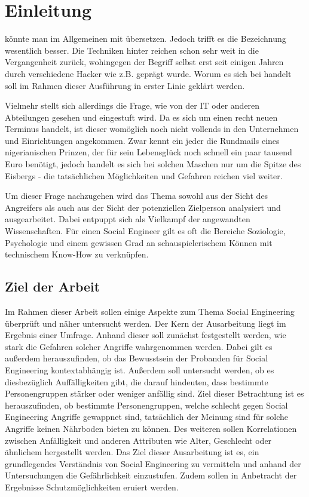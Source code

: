 \section{Einleitung}\label{sec:2_einleitung}
 könnte man im Allgemeinen mit  übersetzen.
Jedoch trifft es die Bezeichnung  wesentlich besser.
Die Techniken hinter  reichen schon sehr weit in die Vergangenheit zurück, wohingegen der Begriff selbst erst seit einigen Jahren durch verschiedene Hacker wie z.B.  geprägt wurde.
Worum es sich bei  handelt soll im Rahmen dieser Ausführung in erster Linie geklärt werden.

Vielmehr stellt sich allerdings die Frage, wie  von der IT oder anderen Abteilungen gesehen und eingestuft wird.
Da es sich um einen recht neuen Terminus handelt, ist dieser womöglich noch nicht vollends in den Unternehmen und Einrichtungen angekommen.
Zwar kennt ein jeder die Rundmails eines nigerianischen Prinzen, der für sein Lebensglück noch schnell ein paar tausend Euro benötigt, jedoch handelt es sich bei solchen Maschen nur um die Spitze des Eisbergs  - die tatsächlichen Möglichkeiten und Gefahren reichen viel weiter.

Um dieser Frage nachzugehen wird das Thema sowohl aus der Sicht des Angreifers als auch aus der Sicht der potenziellen Zielperson analysiert und ausgearbeitet.
Dabei entpuppt sich  als Vielkampf der angewandten Wissenschaften.
Für einen Social Engineer gilt es oft die Bereiche Soziologie, Psychologie und einem gewissen Grad an schauspielerischem Können mit technischem Know-How zu verknüpfen.

\subsection{Ziel der Arbeit}\label{sec:ziel_der_arbeit}
Im Rahmen dieser Arbeit sollen einige Aspekte zum Thema Social Engineering überprüft und näher untersucht werden.
Der Kern der Ausarbeitung liegt im Ergebnis einer Umfrage.
Anhand dieser soll zunächst festgestellt werden, wie stark die Gefahren solcher Angriffe wahrgenommen werden.
Dabei gilt es außerdem herauszufinden, ob das Bewusstsein der Probanden für Social Engineering kontextabhängig ist.
Außerdem soll untersucht werden, ob es diesbezüglich Auffälligkeiten gibt, die darauf hindeuten, dass bestimmte Personengruppen stärker oder weniger anfällig sind.
Ziel dieser Betrachtung ist es herauszufinden, ob bestimmte Personengruppen, welche schlecht gegen Social Engineering Angriffe gewappnet sind, tatsächlich der Meinung sind für solche Angriffe keinen Nährboden bieten zu können.
Des weiteren sollen Korrelationen zwischen Anfälligkeit und anderen Attributen wie Alter, Geschlecht oder ähnlichem hergestellt werden.
Das Ziel dieser Ausarbeitung ist es, ein grundlegendes Verständnis von Social Engineering zu vermitteln
und anhand der Untersuchungen die Gefährlichkeit einzustufen. Zudem sollen in Anbetracht der Ergebnisse
Schutzmöglichkeiten eruiert werden.

